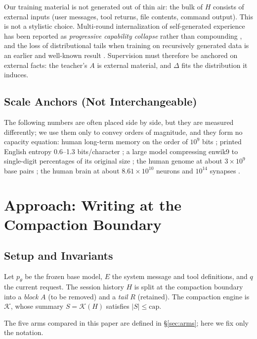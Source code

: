 \documentclass[sigconf,nonacm]{acmart}
\begin{document}
Our training material is not generated out of thin air: the bulk of $H$ consists of external inputs
(user messages, tool returns, file contents, command output). This is not a stylistic choice.
Multi-round internalization of self-generated experience has been reported as \emph{progressive
capability collapse} rather than compounding \cite{collapse2026}, and the loss of distributional tails
when training on recursively generated data is an earlier and well-known result \cite{shumailov2024}.
Supervision must therefore be anchored on external facts: the teacher's $A$ is external material, and
$\Delta$ fits the distribution it induces.

\subsection{Scale Anchors (Not Interchangeable)}

The following numbers are often placed side by side, but they are measured differently; we use them only
to convey orders of magnitude, and they form no capacity equation: human long-term memory on the order of
$10^{9}$ bits \cite{landauer1986}; printed English entropy 0.6--1.3 bits/character \cite{shannon1951}; a
large model compressing enwik9 to single-digit percentages of its original size \cite{deletang2024}; the
human genome at about $3\times10^{9}$ base pairs \cite{genome}; the human brain at about
$8.61\times10^{10}$ neurons \cite{azevedo2009} and $10^{14}$ synapses \cite{brain}.

\section{Approach: Writing at the Compaction Boundary}

\subsection{Setup and Invariants}\label{sec:notation}

Let $p_\theta$ be the frozen base model, $E$ the system message and tool definitions, and $q$ the current
request. The session history $H$ is split at the compaction boundary into a \emph{block} $A$ (to be
removed) and a \emph{tail} $R$ (retained). The compaction engine is $\mathcal{K}$, whose summary
$S=\mathcal{K}(H)$ satisfies $|S|\le\mathrm{cap}$.

The five arms compared in this paper are defined in \S\ref{sec:arms}; here we fix only the notation.
\end{document}

